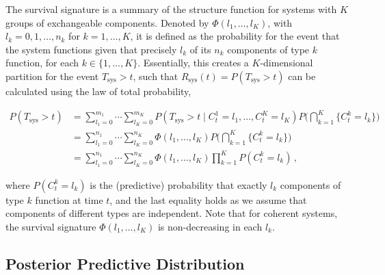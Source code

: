 \documentclass[Journal,SectionNumbers,InsideFigs]{ascelike}
\newcommand{\dd}{\,\mathrm{d}}
\newcommand{\uz}{^{(0)}} %
\newcommand{\Rsys}{R_\text{sys}}
\def\Rsys{R_\text{sys}}
\def\Tsys{T_\text{sys}}
\def\ykz{y\uz_k}
\def\nkz{n\uz_k}
\begin{document}
The survival signature \cite{2012:survsign} is a summary of the structure function
for systems with $K$ groups of exchangeable components.
Denoted by $\Phi(l_1,\ldots,l_K)$, with $l_k=0,1,\ldots,n_k$ for $k=1,\ldots,K$,
it is defined as the probability for the event that the system functions
given that precisely $l_k$ of its $n_k$ components of type $k$ function, for each $k\in \{1,\ldots,K\}$.
Essentially, this creates a $K$-dimensional partition for the event $\Tsys > t$,
such that $\Rsys(t) = P(\Tsys > t)$ can be calculated using the law of total probability,
\begin{linenomath*}
\begin{align}
P(\Tsys > t) &= \sum_{l_1=0}^{m_1} \cdots \sum_{l_K=0}^{m_K} P(\Tsys > t \mid C^1_t = l_1,\ldots, C^K_t = l_K)
                                                                                  P\Big( \bigcap_{k=1}^K \{ C^k_t = l_k\} \Big) \nonumber\\
             &= \sum_{l_1=0}^{n_1} \cdots \sum_{l_K=0}^{n_K} \Phi(l_1,\ldots,l_K) P\Big( \bigcap_{k=1}^K \{ C^k_t = l_k\} \Big) \nonumber\\
             &= \sum_{l_1=0}^{n_1} \cdots \sum_{l_K=0}^{n_K} \Phi(l_1,\ldots,l_K) \prod_{k=1}^K P(C^k_t = l_k)\,,
\label{eq:sysrel-survsign}
\end{align}
\end{linenomath*}
where $P(C^k_t = l_k)$ is the (predictive) probability that exactly $l_k$ components of type $k$ function at time $t$,
and the last equality holds as we assume that components of different types are independent.
Note that for coherent systems,
the survival signature $\Phi(l_1,\ldots,l_K)$ is non-decreasing in each $l_k$.
%


\subsection{Posterior Predictive Distribution}
\label{sec:postpred}
\end{document}
